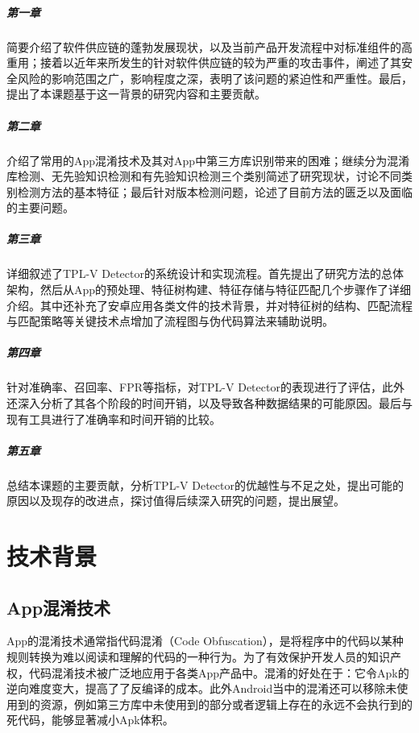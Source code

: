 \paragraph{第一章}简要介绍了软件供应链的蓬勃发展现状，以及当前产品开发流程中对标准组件的高重用；接着以近年来所发生的针对软件供应链的较为严重的攻击事件，阐述了其安全风险的影响范围之广，影响程度之深，表明了该问题的紧迫性和严重性。最后，提出了本课题基于这一背景的研究内容和主要贡献。
\paragraph{第二章}介绍了常用的App混淆技术及其对App中第三方库识别带来的困难；继续分为混淆库检测、无先验知识检测和有先验知识检测三个类别简述了研究现状，讨论不同类别检测方法的基本特征；最后针对版本检测问题，论述了目前方法的匮乏以及面临的主要问题。
\paragraph{第三章}详细叙述了TPL-V Detector的系统设计和实现流程。首先提出了研究方法的总体架构，然后从App的预处理、特征树构建、特征存储与特征匹配几个步骤作了详细介绍。其中还补充了安卓应用各类文件的技术背景，并对特征树的结构、匹配流程与匹配策略等关键技术点增加了流程图与伪代码算法来辅助说明。
\paragraph{第四章}针对准确率、召回率、FPR等指标，对TPL-V Detector的表现进行了评估，此外还深入分析了其各个阶段的时间开销，以及导致各种数据结果的可能原因。最后与现有工具进行了准确率和时间开销的比较。
\paragraph{第五章}总结本课题的主要贡献，分析TPL-V Detector的优越性与不足之处，提出可能的原因以及现存的改进点，探讨值得后续深入研究的问题，提出展望。


\chapter{技术背景}

\section{App混淆技术}
App的混淆技术通常指代码混淆（Code Obfuscation），是将程序中的代码以某种规则转换为难以阅读和理解的代码的一种行为。为了有效保护开发人员的知识产权，代码混淆技术被广泛地应用于各类App产品中。混淆的好处在于：它令Apk的逆向难度变大，提高了了反编译的成本。此外Android当中的混淆还可以移除未使用到的资源，例如第三方库中未使用到的部分或者逻辑上存在的永远不会执行到的死代码，能够显著减小Apk体积\cite{dong2018understanding}。


